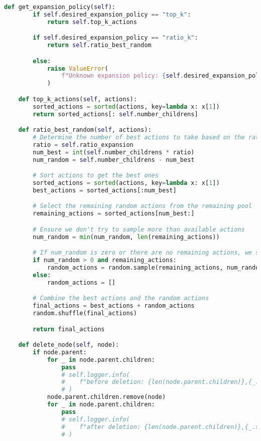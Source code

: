 \begin{lstlisting}[language = Python]
    def get_expansion_policy(self):
        if self.desired_expansion_policy == "top_k":
            return self.top_k_actions

        if self.desired_expansion_policy == "ratio_k":
            return self.ratio_best_random

        else:
            raise ValueError(
                f"Unknown expansion policy: {self.desired_expansion_policy}"
            )

    def top_k_actions(self, actions):
        sorted_actions = sorted(actions, key=lambda x: x[1])
        return sorted_actions[: self.number_childrens]

    def ratio_best_random(self, actions):
        # Determine the number of best actions to take based on the ratio
        ratio = self.ratio_expansion
        num_best = int(self.number_childrens * ratio)
        num_random = self.number_childrens - num_best

        # Sort actions to get the best ones
        sorted_actions = sorted(actions, key=lambda x: x[1])
        best_actions = sorted_actions[:num_best]

        # Select the remaining random actions from the remaining pool
        remaining_actions = sorted_actions[num_best:]

        # Ensure we don't try to sample more than available actions
        num_random = min(num_random, len(remaining_actions))

        # If num_random is zero or there are no remaining actions, we skip the sampling
        if num_random > 0 and remaining_actions:
            random_actions = random.sample(remaining_actions, num_random)
        else:
            random_actions = []

        # Combine the best actions and the random actions
        final_actions = best_actions + random_actions
        random.shuffle(final_actions)

        return final_actions

    def delete_node(self, node):
        if node.parent:
            for _ in node.parent.children:
                pass
                # self.logger.info(
                #    f"before deletion: {len(node.parent.children)},{_.state}"
                # )
            node.parent.children.remove(node)
            for _ in node.parent.children:
                pass
                # self.logger.info(
                #    f"after deletion: {len(node.parent.children)},{_.state}"
                # )


\end{lstlisting}
